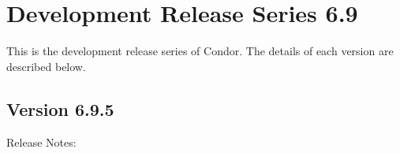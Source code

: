 
\section{\label{sec:History-6-9}Development Release Series 6.9}

This is the development release series of Condor.
The details of each version are described below.

\subsection*{\label{sec:New-6-9-5}Version 6.9.5}

\noindent Release Notes:

